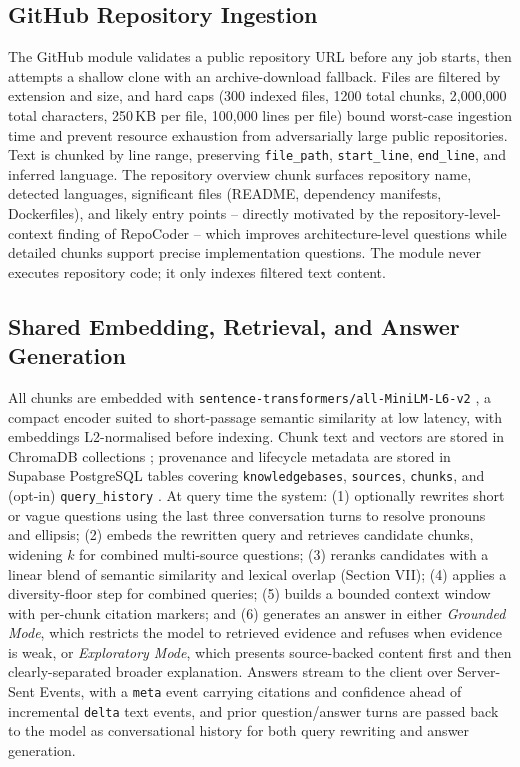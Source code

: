 \documentclass[conference]{IEEEtran}
\begin{document}
\subsection{GitHub Repository Ingestion}
The GitHub module validates a public repository URL before any job
starts, then attempts a shallow clone with an archive-download fallback.
Files are filtered by extension and size, and hard caps
(300 indexed files, 1200 total chunks, 2{,}000{,}000 total characters,
250\,KB per file, 100{,}000 lines per file) bound worst-case ingestion
time and prevent resource exhaustion from adversarially large public
repositories. Text is chunked by line range, preserving
\texttt{file\_path}, \texttt{start\_line}, \texttt{end\_line}, and
inferred language. The repository overview chunk surfaces repository
name, detected languages, significant files (README, dependency
manifests, Dockerfiles), and likely entry points -- directly motivated by
the repository-level-context finding of RepoCoder \cite{zhang2023repocoder}
-- which improves architecture-level questions while detailed chunks
support precise implementation questions. The module never executes
repository code; it only indexes filtered text content.

\subsection{Shared Embedding, Retrieval, and Answer Generation}
All chunks are embedded with
\texttt{sentence-transformers/all-MiniLM-L6-v2}
\cite{minilm2026}, a compact encoder suited to short-passage semantic
similarity at low latency, with embeddings L2-normalised before
indexing. Chunk text and vectors are stored in ChromaDB collections
\cite{chroma2026docs}; provenance and lifecycle metadata are stored in
Supabase PostgreSQL tables covering \texttt{knowledgebases},
\texttt{sources}, \texttt{chunks}, and (opt-in) \texttt{query\_history}
\cite{supabase2026docs}. At query time the system: (1) optionally
rewrites short or vague questions using the last three conversation
turns to resolve pronouns and ellipsis; (2) embeds the rewritten query
and retrieves candidate chunks, widening $k$ for combined multi-source
questions; (3) reranks candidates with a linear blend of semantic
similarity and lexical overlap (Section VII); (4) applies a
diversity-floor step for combined queries; (5) builds a bounded context
window with per-chunk citation markers; and (6) generates an answer in
either \emph{Grounded Mode}, which restricts the model to retrieved
evidence and refuses when evidence is weak, or \emph{Exploratory Mode},
which presents source-backed content first and then clearly-separated
broader explanation. Answers stream to the client over Server-Sent
Events, with a \texttt{meta} event carrying citations and confidence
ahead of incremental \texttt{delta} text events, and prior question/answer
turns are passed back to the model as conversational history for both
query rewriting and answer generation.
\end{document}
